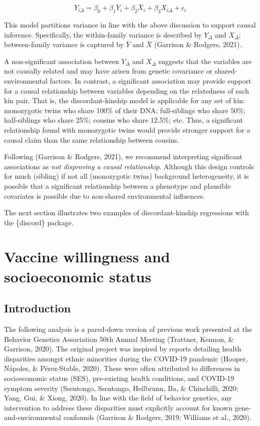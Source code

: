 \documentclass[10pt,a4paper,onecolumn]{article}
\begin{document}
\[
Y_{i\Delta} = \beta_0 + \beta_1 \bar{Y}_i + \beta_2 \bar{X}_i + \beta_3 X_{i\Delta} + \epsilon_i
\]

This model partitions variance in line with the above discussion to
support causal inference. Specifically, the within-family variance is
described by \(Y_{\Delta}\) and \(X_{\Delta}\); between-family variance
is captured by \(\bar{Y}\) and \(\bar{X}\) (Garrison \& Rodgers, 2021).

A non-significant association between \(Y_\Delta\) and \(X_\Delta\)
suggests that the variables are not causally related and may have arisen
from genetic covariance or shared-environmental factors. In contrast, a
significant association may provide support for a causal relationship
between variables depending on the relatedness of each kin pair. That
is, the discordant-kinship model is applicable for any set of kin:
monozygotic twins who share 100\% of their DNA; full-siblings who share
50\%; half-siblings who share 25\%; cousins who share 12.5\%; etc. Thus,
a significant relationship found with monozygotic twins would provide
stronger support for a causal claim than the same relationship between
cousins.

Following (Garrison \& Rodgers, 2021), we recommend interpreting
significant associations as \emph{not disproving a causal relationship}.
Although this design controls for much (sibling) if not all (monozygotic
twins) background heterogeneity, it is possible that a significant
relationship between a phenotype and plausible covariates is possible
due to non-shared environmental influences.

The next section illustrates two examples of discordant-kinship
regressions with the \{discord\} package.

\hypertarget{vaccine-willingness-and-socioeconomic-status}{%
\section{Vaccine willingness and socioeconomic
status}\label{vaccine-willingness-and-socioeconomic-status}}

\hypertarget{introduction}{%
\subsection{Introduction}\label{introduction}}

The following analysis is a pared-down version of previous work
presented at the Behavior Genetics Association 50th Annual Meeting
(Trattner, Kennon, \& Garrison, 2020). The original project was inspired
by reports detailing health disparities amongst ethnic minorities during
the COVID-19 pandemic (Hooper, Nápoles, \& Pérez-Stable, 2020). These
were often attributed to differences in socioeconomic status (SES),
pre-existing health conditions, and COVID-19 symptom severity
(Ssentongo, Ssentongo, Heilbrunn, Ba, \& Chinchilli, 2020; Yang, Gui, \&
Xiong, 2020). In line with the field of behavior genetics, any
intervention to address these disparities must explicitly account for
known gene-and-environmental confounds (Garrison \& Rodgers, 2019;
Williams et al., 2020).
\end{document}
